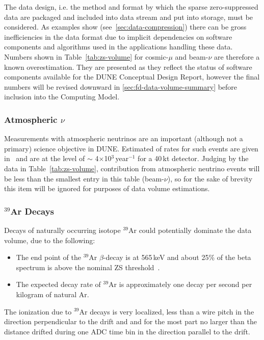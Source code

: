 The data design, i.e. the method and format by which the sparse zero-suppressed data are packaged and included into
data stream and put into storage, must be considered.
As examples show (see~\ref{sec:data-compression})
there can be gross inefficiencies in the data format due to implicit dependencies
on software components and algorithms used in the applications handling these data.
Numbers shown in Table~\ref{tab:zs-volume} for cosmic-$\mu$ and beam-$\nu$
are therefore a known overestimation. They are presented as they reflect the status
of software components available for the DUNE Conceptual Design Report,
however the final numbers will be revised downward in \ref{sec:fd-data-volume-summary}
before inclusion into the Computing Model.

\subsubsection{Atmospheric $\nu$}
\label{sec:atmo-nu}
Measurements with atmospheric neutrinos are an important (although not a primary) science objective in DUNE.
Estimated of rates for such events are given in~\cite{sciopps,cdr_vol2} and are at the level of $\sim$
4$\times$10$^3$\,year$^{-1}$ for a 40\,kt detector. Judging by the data in Table~\ref{tab:zs-volume},
contribution from atmospheric neutrino events will be less than the smallest entry in this table \mbox{(beam-$\nu$)}, so for the sake
of brevity this item will be ignored for purposes of data volume estimations.

\subsubsection{$^{39}$Ar Decays}
\label{sec:ar39decays}
Decays of naturally occurring isotope $^{39}$Ar could potentially dominate the data volume,
due to the following:
\begin{itemize}
\item The end point of the $^{39}$Ar $\beta$-decay is at 565\,keV and about
25\% of the beta spectrum is above the nominal ZS threshold~\cite{ar39endpoint}.

\item The expected decay rate of $^{39}$Ar is approximately one decay per second per kilogram of natural Ar\cite{ar39bkg}.
\end{itemize}
\noindent
The ionization due to $^{39}$Ar decays is very localized, less than a wire pitch in the direction perpendicular
to the drift and  and for the most part no larger than the distance drifted
during one ADC time bin in the direction parallel to the drift.

